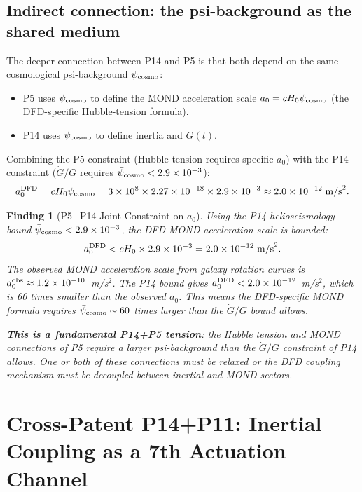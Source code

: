 \documentclass[11pt]{article}
\newtheorem{finding}{Finding}
\newcommand{\ee}[1]{\times 10^{#1}}
\newcommand{\Gt}{G(t)}
\newcommand{\psibar}{\bar{\psi}}
\begin{document}
\subsection{Indirect connection: the psi-background as the shared medium}

The deeper connection between P14 and P5 is that both depend on the same
cosmological psi-background $\psibar_{\rm cosmo}$:
\begin{itemize}
\item P5 uses $\psibar_{\rm cosmo}$ to define the MOND acceleration scale
  $a_0 = c H_0 \psibar_{\rm cosmo}$ (the DFD-specific Hubble-tension formula).
\item P14 uses $\psibar_{\rm cosmo}$ to define inertia and $\Gt$.
\end{itemize}

Combining the P5 constraint (Hubble tension requires specific $a_0$) with
the P14 constraint ($\dot{G}/G$ requires $\psibar_{\rm cosmo} < 2.9\ee{-3}$):
\begin{equation}
a_0^{\rm DFD} = c H_0 \psibar_{\rm cosmo}
= 3\ee{8}\times 2.27\ee{-18}\times 2.9\ee{-3}
\approx 2.0\ee{-12}\;\text{m/s}^2.
\label{eq:a0-DFD}
\end{equation}

\begin{finding}[P5+P14 Joint Constraint on $a_0$]
Using the P14 helioseismology bound $\psibar_{\rm cosmo} < 2.9\ee{-3}$, the
DFD MOND acceleration scale is bounded:
\begin{equation}
a_0^{\rm DFD} < c H_0 \times 2.9\ee{-3} = 2.0\ee{-12}\;\text{m/s}^2.
\label{eq:a0-bound}
\end{equation}
The observed MOND acceleration scale from galaxy rotation curves is
$a_0^{\rm obs} \approx 1.2\ee{-10}$~m/s$^2$. The P14 bound gives
$a_0^{\rm DFD} < 2.0\ee{-12}$~m/s$^2$, which is 60 times smaller than
the observed $a_0$. This means the DFD-specific MOND formula requires
$\psibar_{\rm cosmo} \sim 60$ times larger than the $\dot{G}/G$ bound allows.

\textbf{This is a fundamental P14+P5 tension}: the Hubble tension and MOND
connections of P5 require a larger psi-background than the $\dot{G}/G$
constraint of P14 allows. One or both of these connections must be relaxed
or the DFD coupling mechanism must be decoupled between inertial and
MOND sectors.
\end{finding}

\section{Cross-Patent P14+P11: Inertial Coupling as a 7th Actuation Channel}
\label{sec:P14-P11}
\end{document}
